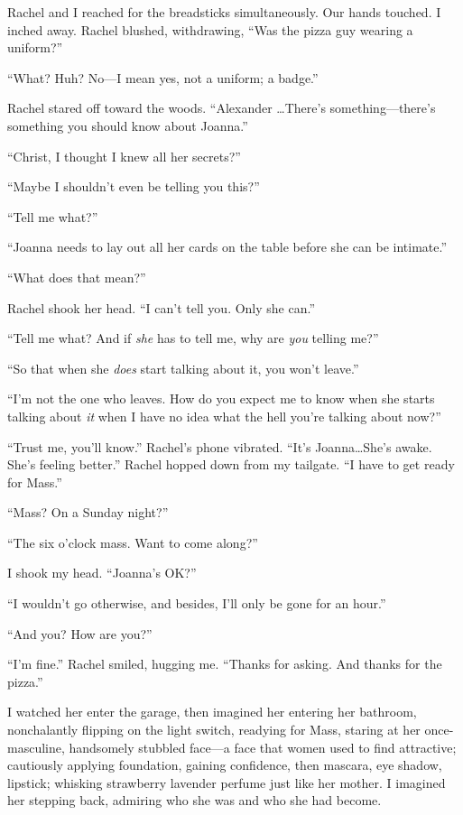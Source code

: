 Rachel and I reached for the breadsticks simultaneously. Our hands
touched. I inched away. Rachel blushed, withdrawing, ``Was the pizza guy
wearing a uniform?''

``What? Huh? No---I mean yes, not a uniform; a badge.''

Rachel stared off toward the woods. ``Alexander \ldots There's
something---there's something you should know about Joanna.''

``Christ, I thought I knew all her secrets?''

``Maybe I shouldn't even be telling you this?''

``Tell me what?''

``Joanna needs to lay out all her cards on the table before she can be
intimate.''

``What does that mean?''

Rachel shook her head. ``I can't tell you. Only she can.''

``Tell me what? And if \emph{she} has to tell me, why are \emph{you}
telling me?''

``So that when she \emph{does} start talking about it, you won't
leave.''

``I'm not the one who leaves. How do you expect me to know when she
starts talking about \emph{it} when I have no idea what the hell you're
talking about now?''

``Trust me, you'll know.'' Rachel's phone vibrated. ``It's
Joanna\ldots She's awake. She's feeling better.'' Rachel hopped down
from my tailgate. ``I have to get ready for Mass.''

``Mass? On a Sunday night?''

``The six o'clock mass. Want to come along?''

I shook my head. ``Joanna's OK?''

``I wouldn't go otherwise, and besides, I'll only be gone for an hour.''

``And you? How are you?''

``I'm fine.'' Rachel smiled, hugging me. ``Thanks for asking. And thanks
for the pizza.''

I watched her enter the garage, then imagined her entering her bathroom,
nonchalantly flipping on the light switch, readying for Mass, staring at
her once-masculine, handsomely stubbled face---a face that women used to
find attractive; cautiously applying foundation, gaining confidence,
then mascara, eye shadow, lipstick; whisking strawberry lavender perfume
just like her mother. I imagined her stepping back, admiring who she was
and who she had become.

